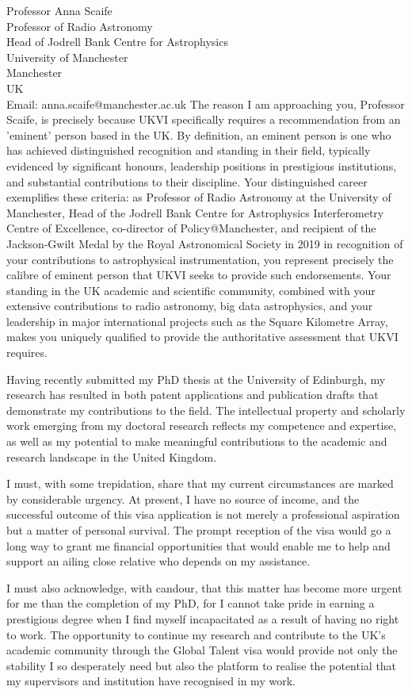 \documentclass[12pt,a4paper]{letter}
\begin{document}
\begin{letter}{Professor Anna Scaife\\Professor of Radio Astronomy\\Head of Jodrell Bank Centre for Astrophysics\\University of Manchester\\Manchester\\UK\\Email: anna.scaife@manchester.ac.uk}
The reason I am approaching you, Professor Scaife, is precisely because UKVI specifically requires a recommendation from an 'eminent' person based in the UK. By definition, an eminent person is one who has achieved distinguished recognition and standing in their field, typically evidenced by significant honours, leadership positions in prestigious institutions, and substantial contributions to their discipline. Your distinguished career exemplifies these criteria: as Professor of Radio Astronomy at the University of Manchester, Head of the Jodrell Bank Centre for Astrophysics Interferometry Centre of Excellence, co-director of Policy@Manchester, and recipient of the Jackson-Gwilt Medal by the Royal Astronomical Society in 2019 in recognition of your contributions to astrophysical instrumentation, you represent precisely the calibre of eminent person that UKVI seeks to provide such endorsements. Your standing in the UK academic and scientific community, combined with your extensive contributions to radio astronomy, big data astrophysics, and your leadership in major international projects such as the Square Kilometre Array, makes you uniquely qualified to provide the authoritative assessment that UKVI requires.

Having recently submitted my PhD thesis at the University of Edinburgh, my research has resulted in both patent applications and publication drafts that demonstrate my contributions to the field. The intellectual property and scholarly work emerging from my doctoral research reflects my competence and expertise, as well as my potential to make meaningful contributions to the academic and research landscape in the United Kingdom.


I must, with some trepidation, share that my current circumstances are marked by considerable urgency. At present, I have no source of income, and the successful outcome of this visa application is not merely a professional aspiration but a matter of personal survival. The prompt reception of the visa would go a long way to grant me financial opportunities that would enable me to help and support an ailing close relative who depends on my assistance. 

I must also acknowledge, with candour, that this matter has become more urgent for me than the completion of my PhD, for I cannot take pride in earning a prestigious degree when I find myself incapacitated as a result of having no right to work. The opportunity to continue my research and contribute to the UK's academic community through the Global Talent visa would provide not only the stability I so desperately need but also the platform to realise the potential that my supervisors and institution have recognised in my work.


\end{letter}
\end{document}
